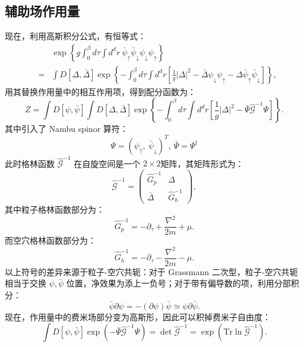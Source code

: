 \documentclass[10pt,UTF8]{ctexart}
\begin{document}
\subsection*{辅助场作用量}
\noindent 现在，利用高斯积分公式，有恒等式：
\begin{eqnarray}
	& & \exp \left\{ g \int_0^\beta d\tau \int d^d r \ \bar\psi_\uparrow \bar\psi_\downarrow \psi_\downarrow \psi_\uparrow \right\} \nonumber \\
	&=& \int D[\Delta, \bar \Delta] \exp \left\{ -\int_0^\beta d\tau \int d^dr \left[ \frac{1}{g}|\Delta|^2-\bar \Delta \psi_\downarrow \psi_\uparrow-\Delta \bar \psi_\uparrow \bar \psi_\downarrow \right] \right\},
\end{eqnarray}
用其替换作用量中的相互作用项，得到配分函数为：
\begin{equation}
	Z=\int D[\psi,\bar \psi]\int D[\Delta, \bar\Delta] \exp \left\{-\int_0^\beta d\tau \int d^d r \left[ \frac{1}{g}|\Delta|^2 - \bar\Psi \hat{\mathcal G}^{-1} \Psi \right] \right\}.
\end{equation}
其中引入了 Nambu spinor 算符：
\begin{equation}
	\Psi = (\psi_\uparrow,\ \bar \psi_\downarrow )^T,
	\ \bar \Psi = \Psi^\dagger
\end{equation}
此时格林函数 $\hat{\mathcal G}^{-1}$ 在自旋空间是一个 $2\times 2$矩阵，其矩阵形式为：
\begin{equation}
	\hat{\mathcal G}^{-1} = \left( 
	\begin{array}{cc}
		\hat G_p^{-1} & \Delta \\
		\bar \Delta & \hat G_h^{-1}
	\end{array}
	\right),
\end{equation}
其中粒子格林函数部分为：
\begin{equation}
	\hat G_p^{-1} = -\partial_\tau+\frac{\nabla^2}{2m}+\mu.
\end{equation}
而空穴格林函数部分为：
\begin{equation}
	\hat G_h^{-1} = -\partial_\tau-\frac{\nabla^2}{2m}-\mu.
\end{equation}
以上符号的差异来源于粒子-空穴共轭：对于 Grassmann 二次型，粒子-空穴共轭相当于交换 $\psi,\bar \psi$ 位置，净效果为添上一负号；对于带有偏导数的项，利用分部积分：
\begin{equation}
	\bar\psi \partial \psi = - (\partial \psi) \bar\psi \simeq \psi \partial \bar\psi.
\end{equation}
现在，作用量中的费米场部分变为高斯形，因此可以积掉费米子自由度：
\begin{equation}
	\int D[\psi,\bar\psi] \exp\left( -\bar\Psi \hat{\mathcal G}^{-1} \Psi \right) = \det \hat{\mathcal G}^{-1} = \exp \left( \mathrm{Tr} \ln \hat{\mathcal G}^{-1} \right).
\end{equation}
\end{document}
